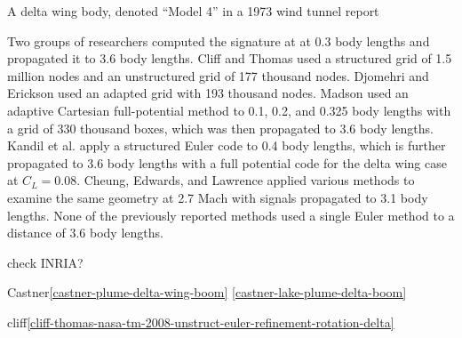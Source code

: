 \documentclass{article}
\begin{document}
A delta wing body,
denoted ``Model 4'' in a 1973 wind tunnel report%
\cite{wing-planform-boom-wt-tn-7160}


Two groups of researchers computed the signature at
at 0.3 body lengths and propagated it to 3.6 body lengths.
Cliff and Thomas\cite{cliff-thomas-boom}
used a structured grid of 1.5 million nodes and
an unstructured grid of 177 thousand nodes.
Djomehri and Erickson\cite{felisa-adapt-boom}
used an adapted grid with 193 thousand nodes.
Madson\cite{madison-tranir-boom} used 
an adaptive Cartesian full-potential
method to 0.1, 0.2, and 0.325 body lengths with
a grid of 330 thousand boxes,
which was then propagated to 3.6 body lengths.
Kandil et al.\cite{kandil-ssbe} apply a 
structured Euler code to 0.4 body lengths,
which is further propagated to 3.6 body lengths
with a full potential code for the delta wing case at $C_L=0.08$.
Cheung, Edwards, and Lawrence\cite{cheung-edwards-lawrence-cfd-boom-extrap} 
applied various methods
to examine the same geometry at 2.7 Mach 
with signals propagated to 3.1 body lengths.
None of the previously reported methods used a single
Euler method to a distance of 3.6 body lengths.


check INRIA?

Castner\ref{castner-plume-delta-wing-boom}
\ref{castner-lake-plume-delta-boom}

cliff\ref{cliff-thomas-nasa-tm-2008-unstruct-euler-refinement-rotation-delta}





\end{document}
